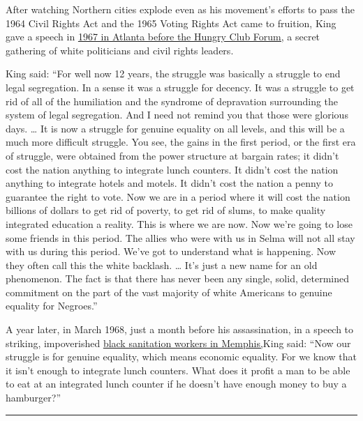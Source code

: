 After watching Northern cities explode even as his movement's efforts to
pass the 1964 Civil Rights Act and the 1965 Voting Rights Act came to
fruition, King gave a speech in
\href{https://www.theatlantic.com/magazine/archive/2018/02/martin-luther-king-hungry-club-forum/552533/}{1967
in Atlanta before the Hungry Club Forum,} a secret gathering of white
politicians and civil rights leaders.

King said: ``For well now 12 years, the struggle was basically a
struggle to end legal segregation. In a sense it was a struggle for
decency. It was a struggle to get rid of all of the humiliation and the
syndrome of depravation surrounding the system of legal segregation. And
I need not remind you that those were glorious days. \ldots{} It is now
a struggle for genuine equality on all levels, and this will be a much
more difficult struggle. You see, the gains in the first period, or the
first era of struggle, were obtained from the power structure at bargain
rates; it didn't cost the nation anything to integrate lunch counters.
It didn't cost the nation anything to integrate hotels and motels. It
didn't cost the nation a penny to guarantee the right to vote. Now we
are in a period where it will cost the nation billions of dollars to get
rid of poverty, to get rid of slums, to make quality integrated
education a reality. This is where we are now. Now we're going to lose
some friends in this period. The allies who were with us in Selma will
not all stay with us during this period. We've got to understand what is
happening. Now they often call this the white backlash. \ldots{} It's
just a new name for an old phenomenon. The fact is that there has never
been any single, solid, determined commitment on the part of the vast
majority of white Americans to genuine equality for Negroes.''

A year later, in March 1968, just a month before his assassination, in a
speech to striking, impoverished
\href{http://www.nowcrj.org/wp-content/uploads/2015/01/King-Speech-Excerpts-1968-03-18-FINAL.pdf}{black
sanitation workers in Memphis,}King said: ``Now our struggle is for
genuine equality, which means economic equality. For we know that it
isn't enough to integrate lunch counters. What does it profit a man to
be able to eat at an integrated lunch counter if he doesn't have enough
money to buy a hamburger?''

\begin{center}\rule{0.5\linewidth}{\linethickness}\end{center}

